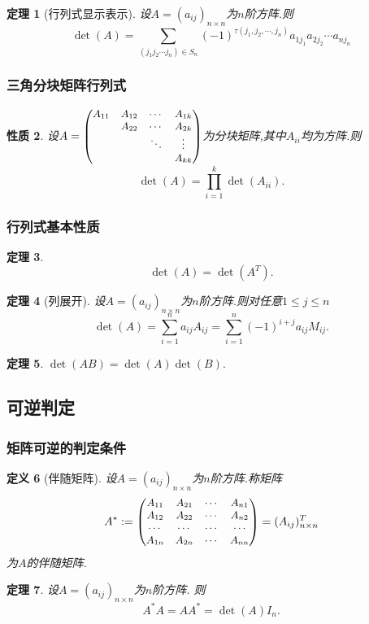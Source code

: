 \documentclass{article}
\newtheorem{theorem}{定理}  %
\newtheorem{proposition}[theorem]{性质}  %
\newtheorem{definition}[theorem]{定义}
\renewcommand{\blue }[1]{{\textcolor[rgb]{0,0,1}{#1}}}
\begin{document}
\begin{theorem}[行列式显示表示]
设$A=(a_{ij})_{n\times n}$为$n$阶方阵.则
\begin{equation*}
\det(A) = \sum_{(j_1j_2\cdots j_n)\in S_n}(-1)^{\tau(j_1,j_2,\cdots,j_n)} a_{1j_1}a_{2j_2}\cdots a_{nj_n}
\end{equation*}
\end{theorem}

\subsubsection{三角分块矩阵行列式}
\begin{proposition}
设$\small A=
\begin{pmatrix}
A_{11}&A_{12}&\cdots&A_{1k}\\
&A_{22}&\cdots&A_{2k}\\
&      &\ddots&\vdots\\
&      &      &A_{kk}\\
\end{pmatrix}$为分块矩阵,其中$A_{ii}$均为方阵.则
\[\det(A)=\prod_{i=1}^k \det(A_{ii}).\]
\end{proposition}

\subsubsection{行列式基本性质}
\begin{theorem}
\[\det(A)=\det(A^T).\]
\end{theorem}
\begin{theorem}[列展开]
设$A=(a_{ij})_{n\times n}$为$n$阶方阵.则对任意$1\leq j \leq n$
\[\boxed{\det(A)=\sum_{i=1}^na_{ij}A_{ij} = \sum_{i=1}^{n}(-1)^{i+j}a_{ij}M_{ij}.}\]
\end{theorem}
\begin{theorem}$\det(AB)=\det(A)\det(B).$
\end{theorem}


\subsection{可逆判定}

\subsubsection{矩阵可逆的判定条件}
\begin{definition}[伴随矩阵]
设$A=(a_{ij})_{n\times n}$为$n$阶方阵.称矩阵
\[\small A^*:=\begin{pmatrix}
A_{11}&A_{21}&\cdots&A_{n1}\\
A_{12}&A_{22}&\cdots&A_{n2}\\
\cdots&\cdots&\cdots&\cdots\\
A_{1n}&A_{2n}&\cdots&A_{nn}\\
\end{pmatrix}=(A_{ij})_{n\times n}^T\]
为$A$的\blue{伴随矩阵}.
\end{definition}
\begin{theorem}
设$A=(a_{ij})_{n\times n}$为$n$阶方阵. 则
\[A^*A=AA^*=\det(A)I_n.\]
\end{theorem}
\end{document}
